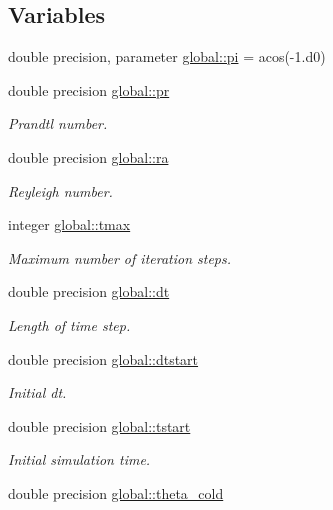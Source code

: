 \subsection*{Variables}
\begin{DoxyCompactItemize}
\item 
double precision, parameter \hyperlink{namespaceglobal_a2eeeef6cb4401e0205ced808c718dead}{global\+::pi} = acos(-\/1.d0)
\item 
double precision \hyperlink{namespaceglobal_a31749f11f262d021576cd0d09bdc79c2}{global\+::pr}
\begin{DoxyCompactList}\small\item\em Prandtl number. \end{DoxyCompactList}\item 
double precision \hyperlink{namespaceglobal_a7b363950bb58d4e52dda12a928b2b9e2}{global\+::ra}
\begin{DoxyCompactList}\small\item\em Reyleigh number. \end{DoxyCompactList}\item 
integer \hyperlink{namespaceglobal_ac8816f9dd096716fb9b7e61d57cc5189}{global\+::tmax}
\begin{DoxyCompactList}\small\item\em Maximum number of iteration steps. \end{DoxyCompactList}\item 
double precision \hyperlink{namespaceglobal_a24d27ecfb0e7d422997122c9345bac8b}{global\+::dt}
\begin{DoxyCompactList}\small\item\em Length of time step. \end{DoxyCompactList}\item 
double precision \hyperlink{namespaceglobal_a3c8fbc22da61f7188e79bad2b9ba1d16}{global\+::dtstart}
\begin{DoxyCompactList}\small\item\em Initial dt. \end{DoxyCompactList}\item 
double precision \hyperlink{namespaceglobal_a07363365436fd22a91cdb5a847b4bb88}{global\+::tstart}
\begin{DoxyCompactList}\small\item\em Initial simulation time. \end{DoxyCompactList}\item 
double precision \hyperlink{namespaceglobal_a367640054e0083add94204f1a61bd61a}{global\+::theta\+\_\+cold}

\end{DoxyCompactItemize}
